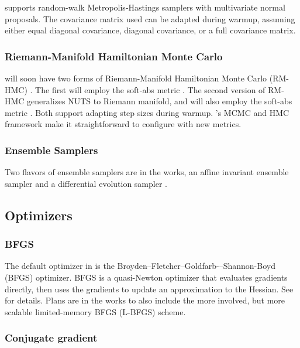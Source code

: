 \documentclass[article]{jss}
\begin{document}
 supports random-walk Metropolis-Hastings samplers with
multivariate normal proposals.  The covariance matrix used can be
adapted during warmup, assuming either equal diagonal covariance,
diagonal covariance, or a full covariance matrix.


\subsubsection{Riemann-Manifold Hamiltonian Monte Carlo}

 will soon have two forms of Riemann-Manifold
Hamiltonian Monte Carlo (RM-HMC) \citep{GirolamiCalderhead:2011}.  The
first will employ the soft-abs metric \citep{Betancourt:2012}.  The
second version of RM-HMC generalizes NUTS to Riemann manifold, and
will also employ the soft-abs metric \citep{Betancourt:2013}.  Both
support adapting step sizes during warmup.  's MCMC and
HMC framework make it straightforward to configure with new metrics.

\subsubsection{Ensemble Samplers}

Two flavors of ensemble samplers are in the works, an affine invariant
ensemble sampler \citep{GoodmanWeare:2010} and a differential
evolution sampler \cite{TerBraak:2006}.

\subsection{Optimizers}

\subsubsection{BFGS}

The default optimizer in  is the
Broyden–Fletcher–Goldfarb-–Shannon-Boyd (BFGS) optimizer.  BFGS is a
quasi-Newton optimizer that evaluates gradients directly, then uses
the gradients to update an approximation to the Hessian.  See
\citep{NocedalWright:2006} for details.  Plans are in the works to
also include the more involved, but more scalable limited-memory BFGS
(L-BFGS) scheme.

\subsubsection{Conjugate gradient}
\end{document}
